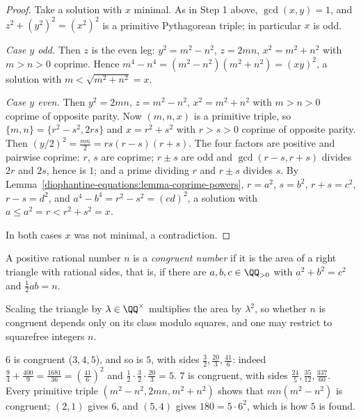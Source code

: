 \begin{proof}
Take a solution with $x$ minimal. As in Step 1 above, $\gcd(x, y) = 1$, and $z^2 + (y^2)^2 = (x^2)^2$ is a primitive Pythagorean triple; in particular $x$ is odd.

\emph{Case $y$ odd.} Then $z$ is the even leg: $y^2 = m^2 - n^2$, $z = 2mn$, $x^2 = m^2 + n^2$ with $m > n > 0$ coprime. Hence $m^4 - n^4 = (m^2 - n^2)(m^2 + n^2) = (xy)^2$, a solution with
$m < \sqrt{m^2 + n^2} = x$.

\emph{Case $y$ even.} Then $y^2 = 2mn$, $z = m^2 - n^2$, $x^2 = m^2 + n^2$ with $m > n > 0$ coprime of opposite parity. Now $(m, n, x)$ is a primitive triple, so $\{m, n\} = \{r^2 - s^2, 2rs\}$ and
$x = r^2 + s^2$ with $r > s > 0$ coprime of opposite parity. Then $(y/2)^2 = \frac{mn}{2} = rs(r - s)(r + s)$. The four factors are positive and pairwise coprime: $r$, $s$ are coprime; $r \pm s$ are odd and
$\gcd(r - s, r + s)$ divides $2r$ and $2s$, hence is $1$; and a prime dividing $r$ and $r \pm s$ divides $s$. By Lemma~\ref{diophantine-equations:lemma-coprime-powers}, $r = a^2$, $s = b^2$, $r + s = c^2$,
$r - s = d^2$, and $a^4 - b^4 = r^2 - s^2 = (cd)^2$, a solution with $a \leq a^2 = r < r^2 + s^2 = x$.

In both cases $x$ was not minimal, a contradiction.
\end{proof}

\begin{definition}\label{diophantine-equations:definition-congruent}
A positive rational number $n$ is a \emph{congruent number} if it is the area of a right triangle with rational sides, that is, if there are $a, b, c \in \QQ_{> 0}$ with $a^2 + b^2 = c^2$ and $\frac12ab = n$.
\end{definition}

Scaling the triangle by $\lambda \in \QQ^\times$ multiplies the area by $\lambda^2$, so whether $n$ is congruent depends only on its class modulo squares, and one may restrict to squarefree integers $n$.

\begin{example}\label{diophantine-equations:example-congruent}
$6$ is congruent ($3, 4, 5$), and so is $5$, with sides $\frac32, \frac{20}{3}, \frac{41}{6}$: indeed $\frac94 + \frac{400}{9} = \frac{1681}{36} = (\frac{41}{6})^2$ and $\frac12 \cdot \frac32 \cdot \frac{20}{3} = 5$.
$7$ is congruent, with sides $\frac{24}{5}, \frac{35}{12}, \frac{337}{60}$. Every primitive triple $(m^2 - n^2, 2mn, m^2 + n^2)$ shows that $mn(m^2 - n^2)$ is congruent; $(2, 1)$ gives $6$, and $(5, 4)$
gives $180 = 5 \cdot 6^2$, which is how $5$ is found.
\end{example}

